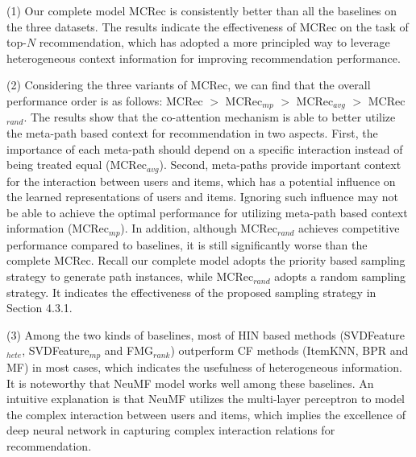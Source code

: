(1) Our complete model MCRec is consistently better than all the baselines on the three datasets. The results indicate the effectiveness of MCRec on the task of top-$N$ recommendation,  which has adopted a more principled way to leverage heterogeneous context information for improving recommendation performance.

(2) Considering the three variants of MCRec, we can find that the overall performance order is as follows: MCRec $>$ MCRec$_{mp}$ $>$ MCRec$_{avg}$ $>$ MCRec$_{rand}$. The results show that the co-attention mechanism is able to better utilize the meta-path based context for recommendation in two aspects. First, the importance of each meta-path should depend on a specific interaction instead of being treated equal (\ie MCRec$_{avg}$).  Second,
meta-paths provide important context for the interaction between users and items, which has a potential influence on the learned representations of users and items. Ignoring such influence may not be able to achieve the optimal performance for utilizing meta-path based context information (\ie MCRec$_{mp}$). In addition, although MCRec$_{rand}$ achieves competitive performance compared to baselines, it is still significantly worse than the complete MCRec. Recall our complete model adopts the priority based sampling strategy to generate path instances, while MCRec$_{rand}$ adopts a random sampling strategy. It indicates the effectiveness of the proposed sampling strategy in Section 4.3.1.  


(3) Among the two kinds of baselines, most of HIN based methods (SVDFeature$_{hete}$, SVDFeature$_{mp}$ and FMG$_{rank}$) outperform CF methods (ItemKNN, BPR and MF) in most cases, which indicates the usefulness of heterogeneous information. It is noteworthy that NeuMF model works well among these baselines. An intuitive explanation is that NeuMF utilizes the multi-layer perceptron to model the complex interaction between users and items, which implies the excellence of deep neural network in capturing complex interaction relations for recommendation.

